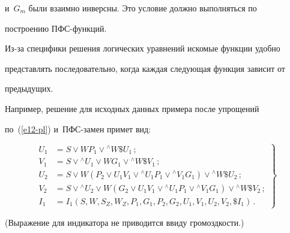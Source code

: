 и~$G_m$ были взаимно инверсны. Это условие должно выполняться по 


построению ПФС-функ\-ций.


   


   Из-за специфики решения логических уравнений искомые функции удобно 


представлять последовательно, когда каждая следующая функция зависит от 


предыдущих.


   


   Например, решение для исходных данных примера после упрощений 


по~(\ref{e12-pl}) и~ПФС-за\-мен примет вид:





\noindent


   \begin{equation}


   \left.


   \begin{array}{rl}


   U_1& = S \vee W P_1 \vee {^\wedge W} \$U_1\,;\\[6pt]


   V_1& = S \vee {^\wedge U_1} \vee W G_1 \vee {^\wedge W} \$V_1\,;\\[6pt]


    U_2& = S \vee  W \left(P_2 \vee U_1 V_1 \vee {^\wedge U_1} P_1 \vee {^\wedge V_1} 


G_1\right) \vee {^\wedge W} \$U_2\,;\\[6pt]


   V_2& = S \vee {^\wedge U_2} \vee W \left(G_2 \vee U_1 V_1 \vee  {^\wedge U_1} P_1 


\vee {^\wedge V_1} G_1\right) \vee {^\wedge W} \$V_2\,;\\[6pt]


   I_1 &= I_1\left(S, W, S_Z, W_Z, P_1, G_1, P_2, G_2, U_1, V_1, U_2, V_2, \$I_1\right)\,.


   \end{array}


   \right\}


   \label{e13-pl}


   \end{equation}


   (Выражение для индикатора не приводится ввиду громоздкости.)


